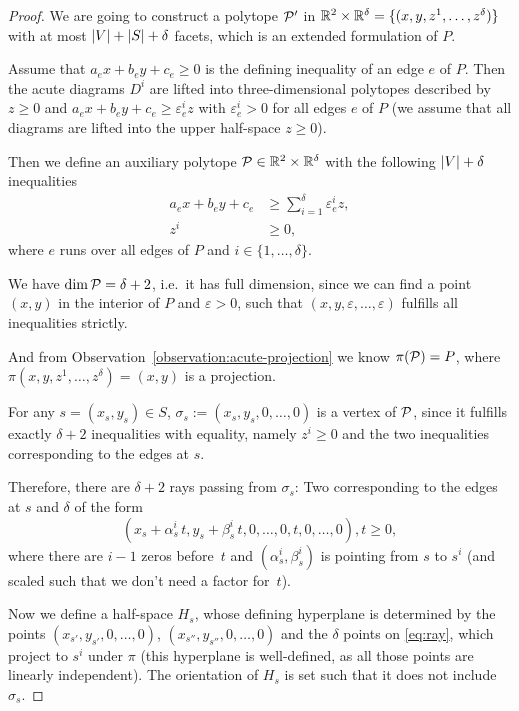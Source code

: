 \begin{proof}
  We are going to construct a polytope $\P'$ in $\R^2 \times \R^{\delta} = \{(x,y,z^1,\dots,z^{\delta})\}$ with at most $\abs{V}+\abs{S}+\delta$ facets, which is an extended formulation of $P$.

  Assume that $a_e x + b_e y + c_e \geq 0$ is the defining inequality of an edge $e$ of $P$. Then the acute diagrams $D^i$ are lifted into three-dimensional polytopes described by $z \geq 0$ and $a_e x + b_e y + c_e \geq \varepsilon_e^i z$ with $\varepsilon_e^i > 0$ for all edges $e$ of $P$ (we assume that all diagrams are lifted into the upper half-space $z \geq 0$).

  Then we define an auxiliary polytope $\P \in \R^2 \times \R^{\delta}$ with the following $\abs{V}+\delta$ inequalities
  \begin{align*}
    a_e x + b_e y + c_e & \geq \sum_{i=1}^{\delta} \varepsilon_e^i z, \\
    z^i                 & \geq 0,
  \end{align*}
  where $e$ runs over all edges of $P$ and $i \in \{1,\dots,\delta\}$.

  We have $\dim \P = \delta + 2$, i.e.\ it has full dimension, since we can find a point $(x,y)$ in the interior of $P$ and $\varepsilon > 0$, such that $(x,y,\varepsilon,\dots,\varepsilon)$ fulfills all inequalities strictly.

  And from Observation~\ref{observation:acute-projection} we know $\pi(\P)=P$, where $\pi(x,y,z^1,\dots,z^{\delta}) = (x,y)$ is a projection.

  For any $s = (x_s, y_s) \in S$, $\sigma_s := (x_s,y_s,0,\dots,0)$ is a vertex of $\P$, since it fulfills exactly $\delta + 2$ inequalities with equality, namely $z^i \geq 0$ and the two inequalities corresponding to the edges at $s$.

  Therefore, there are $\delta + 2$ rays passing from $\sigma_s$: Two corresponding to the edges at $s$ and $\delta$ of the form
  \begin{equation}\label{eq:ray}
    (x_s + \alpha_s^i\,t,y_s + \beta_s^i\,t,0,\dots,0,t,0,\dots,0), t \geq 0,
  \end{equation}
  where there are $i-1$ zeros before~$t$ and $(\alpha_s^i, \beta_s^i)$ is pointing from $s$ to $s^i$ (and scaled such that we don't need a factor for~$t$).

  Now we define a half-space $H_s$, whose defining hyperplane is determined by the points $(x_{s'},y_{s'},0,\dots,0)$, $(x_{s''},y_{s''},0,\dots,0)$ and the $\delta$ points on \eqref{eq:ray}, which project to $s^i$ under $\pi$ (this hyperplane is well-defined, as all those points are linearly independent). The orientation of $H_s$ is set such that it does not include $\sigma_s$.


\end{proof}
